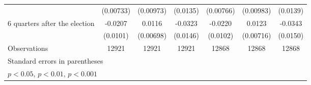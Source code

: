 \begin{table}[htbp]
\begin{tabular}{l*{6}{c}}
                    &   (0.00733)         &   (0.00973)         &    (0.0135)         &   (0.00766)         &   (0.00983)         &    (0.0139)         \\
[1em]
 6 quarters after the election&     -0.0207\sym{*}  &      0.0116         &     -0.0323\sym{*}  &     -0.0220\sym{*}  &      0.0123         &     -0.0343\sym{*}  \\
                    &    (0.0101)         &   (0.00698)         &    (0.0146)         &    (0.0102)         &   (0.00716)         &    (0.0150)         \\
\hline
Observations        &       12921         &       12921         &       12921         &       12868         &       12868         &       12868         \\
\hline\hline
\multicolumn{7}{l}{\footnotesize Standard errors in parentheses}\\
\multicolumn{7}{l}{\footnotesize \sym{*} \(p<0.05\), \sym{**} \(p<0.01\), \sym{***} \(p<0.001\)}\\
\end{tabular}
\end{table}
